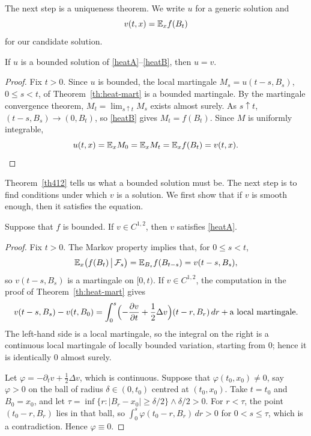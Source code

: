 The next step is a uniqueness theorem. We write $u$ for a generic solution and
\[
	v(t,x) = \mathbb{E}_x f(B_t)
\]
for our candidate solution.

\begin{theorem}\label{th412}
	If $u$ is a bounded solution of \ref{heatA}--\ref{heatB}, then $u = v$.
\end{theorem}
\begin{proof}
	Fix $t>0$. Since $u$ is bounded, the local martingale
	$M_s = u(t-s,B_s)$, $0\leqslant s<t$, of Theorem~\ref{th:heat-mart} is a
	bounded martingale. By the martingale convergence theorem,
	$M_t = \lim_{s\uparrow t}M_s$ exists almost surely. As $s\uparrow t$,
	$(t-s,B_s)\to(0,B_t)$, so \ref{heatB} gives $M_t = f(B_t)$. Since $M$ is
	uniformly integrable,
	\[
		u(t,x) = \mathbb{E}_x M_0 = \mathbb{E}_x M_t = \mathbb{E}_x f(B_t) = v(t,x). \qedhere
	\]
\end{proof}

Theorem~\ref{th412} tells us what a bounded solution must be. The next step is
to find conditions under which $v$ is a solution. We first show that if $v$ is
smooth enough, then it satisfies the equation.

\begin{theorem}\label{th:heat-smooth-sol}
	Suppose that $f$ is bounded. If $v\in C^{1,2}$, then $v$ satisfies
	\ref{heatA}.
\end{theorem}
\begin{proof}
	Fix $t>0$. The Markov property implies that, for $0\leqslant s<t$,
	\[
		\mathbb{E}_x\bigl(f(B_t)\,\big|\,\mathcal{F}_s\bigr) = \mathbb{E}_{B_s}f(B_{t-s}) = v(t-s,B_s),
	\]
	so $v(t-s,B_s)$ is a martingale on $[0,t)$. If $v\in C^{1,2}$, the
	computation in the proof of Theorem~\ref{th:heat-mart} gives
	\[
		v(t-s,B_s) - v(t,B_0) = \int_0^s\Bigl(-\frac{\partial v}{\partial t}
		+ \frac{1}{2}\Delta v\Bigr)(t-r,B_r)\,dr + \text{a local martingale.}
	\]
	The left-hand side is a local martingale, so the integral on the right is a
	continuous local martingale of locally bounded variation, starting from $0$;
	hence it is identically $0$ almost surely.

	Let $\varphi = -\partial_t v + \frac{1}{2}\Delta v$, which is continuous.
	Suppose that $\varphi(t_0,x_0) \neq 0$, say $\varphi>0$ on the ball of
	radius $\delta\in(0,t_0)$ centred at $(t_0,x_0)$. Take $t=t_0$ and
	$B_0 = x_0$, and let
	$\tau = \inf\{r : |B_r - x_0|\geqslant\delta/2\}\wedge\delta/2 > 0$. For
	$r<\tau$, the point $(t_0-r,B_r)$ lies in that ball, so
	$\int_0^{s}\varphi(t_0-r,B_r)\,dr>0$ for $0<s\leqslant\tau$, which is a
	contradiction. Hence $\varphi\equiv0$.
\end{proof}

